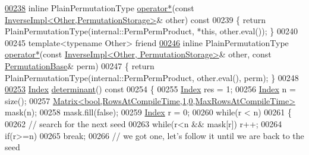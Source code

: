 \begin{DoxyCode}
\hyperlink{group___core___module_a865e88989a76b7e92f39bad5250b89c4}{00238}     \textcolor{keyword}{inline} PlainPermutationType \hyperlink{group___core___module_a865e88989a76b7e92f39bad5250b89c4}{operator*}(\textcolor{keyword}{const} 
      \hyperlink{class_eigen_1_1_inverse_impl}{InverseImpl<Other,PermutationStorage>}& other)\textcolor{keyword}{ const}
00239 \textcolor{keyword}{    }\{ \textcolor{keywordflow}{return} PlainPermutationType(internal::PermPermProduct, *\textcolor{keyword}{this}, other.eval()); \}
00240 
00245     \textcolor{keyword}{template}<\textcolor{keyword}{typename} Other> \textcolor{keyword}{friend}
\hyperlink{group___core___module_a3f404810659d5095a6db906a4728ddfb}{00246}     \textcolor{keyword}{inline} PlainPermutationType \hyperlink{group___core___module_a3f404810659d5095a6db906a4728ddfb}{operator*}(\textcolor{keyword}{const} 
      \hyperlink{class_eigen_1_1_inverse_impl}{InverseImpl<Other, PermutationStorage>}& other, \textcolor{keyword}{const} 
      \hyperlink{group___core___module_class_eigen_1_1_permutation_base}{PermutationBase}& perm)
00247     \{ \textcolor{keywordflow}{return} PlainPermutationType(internal::PermPermProduct, other.eval(), perm); \}
00248     
\hyperlink{group___core___module_a1fc7a5823544700c2e0795e87f9c6d09}{00253}     \hyperlink{group___core___module_a554f30542cc2316add4b1ea0a492ff02}{Index} \hyperlink{group___core___module_a1fc7a5823544700c2e0795e87f9c6d09}{determinant}()\textcolor{keyword}{ const}
00254 \textcolor{keyword}{    }\{
00255       \hyperlink{group___core___module_a554f30542cc2316add4b1ea0a492ff02}{Index} res = 1;
00256       \hyperlink{group___core___module_a554f30542cc2316add4b1ea0a492ff02}{Index} n = size();
00257       \hyperlink{group___core___module_class_eigen_1_1_matrix}{Matrix<bool,RowsAtCompileTime,1,0,MaxRowsAtCompileTime>}
       mask(n);
00258       mask.fill(\textcolor{keyword}{false});
00259       \hyperlink{group___core___module_a554f30542cc2316add4b1ea0a492ff02}{Index} r = 0;
00260       \textcolor{keywordflow}{while}(r < n)
00261       \{
00262         \textcolor{comment}{// search for the next seed}
00263         \textcolor{keywordflow}{while}(r<n && mask[r]) r++;
00264         \textcolor{keywordflow}{if}(r>=n)
00265           \textcolor{keywordflow}{break};
00266         \textcolor{comment}{// we got one, let's follow it until we are back to the seed}

\end{DoxyCode}
